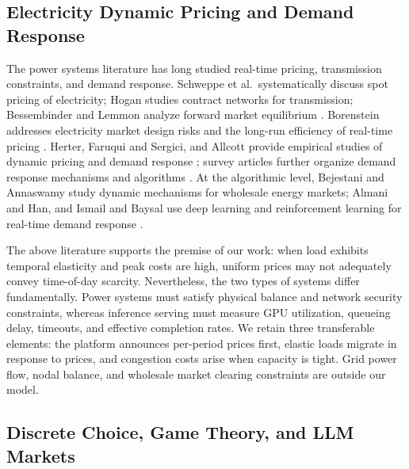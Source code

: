 \documentclass[11pt]{article}
\begin{document}
\subsection{Electricity Dynamic Pricing and Demand Response}

The power systems literature has long studied real-time pricing, transmission
constraints, and demand response. Schweppe et al.\ systematically discuss
spot pricing of electricity; Hogan studies contract networks for
transmission; Bessembinder and Lemmon analyze forward market equilibrium
\cite{schweppe1988spot,hogan1992contract,
bessembinder2002equilibrium}.
Borenstein addresses electricity market design risks and the long-run
efficiency of real-time pricing
\cite{borenstein2002trouble,borenstein2005long}.
Herter, Faruqui and Sergici, and Allcott provide empirical studies of
dynamic pricing and demand response
\cite{herter2007residential,faruqui2010household,allcott2011rethinking};
survey articles further organize demand response mechanisms and algorithms
\cite{albadi2008summary,siano2014demand,vazquez2019reinforcement}.
At the algorithmic level, Bejestani and Annaswamy study dynamic mechanisms
for wholesale energy markets; Almani and Han, and Ismail and Baysal use
deep learning and reinforcement learning for real-time demand response
\cite{bejestani2014dynamic,almani2023realtime,ismail2023dynamic}.

The above literature supports the premise of our work: when load exhibits
temporal elasticity and peak costs are high, uniform prices may not
adequately convey time-of-day scarcity. Nevertheless, the two types of
systems differ fundamentally. Power systems must satisfy physical balance
and network security constraints, whereas inference serving must measure
GPU utilization, queueing delay, timeouts, and effective completion rates.
We retain three transferable elements: the platform announces per-period
prices first, elastic loads migrate in response to prices, and congestion
costs arise when capacity is tight. Grid power flow, nodal balance, and
wholesale market clearing constraints are outside our model.

\subsection{Discrete Choice, Game Theory, and LLM Markets}
\end{document}
